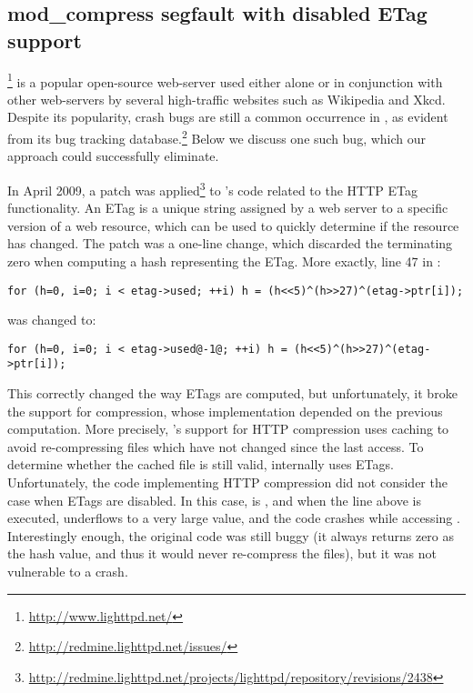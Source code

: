 \subsection{\lighttpd mod\_compress segfault with disabled ETag support}

\lighttpd\footnote{\url{http://www.lighttpd.net/}} is a popular open-source 
web-server used either alone or in conjunction with other web-servers
by several high-traffic websites such as Wikipedia and Xkcd.
Despite its popularity, crash bugs are still a common
occurrence in \lighttpd, as evident from its bug tracking
database.\footnote{\url{http://redmine.lighttpd.net/issues/}}  Below
we discuss one such bug, which our approach could successfully
eliminate.

In April 2009, a patch was
applied\footnote{\url{http://redmine.lighttpd.net/projects/lighttpd/repository/revisions/2438}}
to \lighttpd's code related to the HTTP ETag functionality.  An ETag
is a unique string assigned by a web server to a specific version of a
web resource, which can be used to quickly determine if the resource
has changed.  The patch was a one-line change, which discarded the
terminating zero when computing a hash representing the ETag.  More
exactly, line 47 in :

\begin{lstlisting}[numbers=none,breaklines=true,xleftmargin=0pt]
for (h=0, i=0; i < etag->used; ++i) h = (h<<5)^(h>>27)^(etag->ptr[i]);
\end{lstlisting}
\noindent was changed to:
\begin{lstlisting}[numbers=none,breaklines=true,xleftmargin=0pt]
for (h=0, i=0; i < etag->used@-1@; ++i) h = (h<<5)^(h>>27)^(etag->ptr[i]);
\end{lstlisting}

This correctly changed the way ETags are computed, but unfortunately,
it broke the support for compression, whose implementation depended on
the previous computation.  More precisely, \lighttpd's support for HTTP
compression uses caching to avoid re-compressing files which have not
changed since the last access.  To determine whether the cached
file is still valid, \lighttpd internally uses ETags.  Unfortunately,
the code implementing HTTP compression did not consider the case when
ETags are disabled.  In this case, 
is , and when the line above is
executed,  underflows to a very large value, and
the code crashes while accessing .
Interestingly enough, the original code was still buggy (it always
returns zero as the hash value, and thus it would never re-compress
the files), but it was not vulnerable to a crash.

